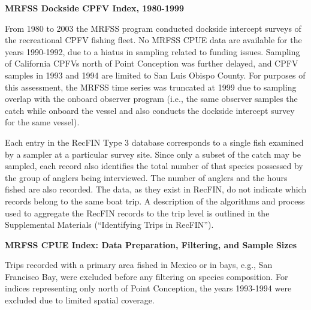 \documentclass[11pt,
  english,
]{article}
\begin{document}
\leavevmode\tagmcend\tagstructend

\renewcommand{\thepage}{B\arabic{page}}
\renewcommand{\thefigure}{B\arabic{figure}}
\renewcommand{\thetable}{B\arabic{table}}
\setcounter{page}{1}
\setcounter{figure}{0}
\setcounter{table}{0}

\textbf{MRFSS Dockside CPFV Index, 1980-1999}

From 1980 to 2003 the MRFSS program conducted dockside intercept surveys of the recreational CPFV fishing fleet. No MRFSS CPUE data are available for the years 1990-1992, due to a hiatus in sampling related to funding issues. Sampling of California CPFVs north of Point Conception was further delayed, and CPFV samples in 1993 and 1994 are limited to San Luis Obispo County. For purposes of this assessment, the MRFSS time series was truncated at 1999 due to sampling overlap with the onboard observer program (i.e., the same observer samples the catch while onboard the vessel and also conducts the dockside intercept survey for the same vessel).

Each entry in the RecFIN Type 3 database corresponds to a single fish examined by a sampler at a particular survey site. Since only a subset of the catch may be sampled, each record also identifies the total number of that species possessed by the group of anglers being interviewed. The number of anglers and the hours fished are also recorded. The data, as they exist in RecFIN, do not indicate which records belong to the same boat trip. A description of the algorithms and process used to aggregate the RecFIN records to the trip level is outlined in the Supplemental Materials (``Identifying Trips in RecFIN'').

\textbf{MRFSS CPUE Index: Data Preparation, Filtering, and Sample Sizes}

Trips recorded with a primary area fished in Mexico or in bays, e.g., San Francisco Bay, were excluded before any filtering on species composition. For indices representing only north of Point Conception, the years 1993-1994 were excluded due to limited spatial coverage.
\end{document}
